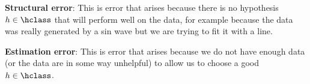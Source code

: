\documentclass[10pt,oneside]{book}
\begin{document}
\pagestyle{empty}
\thispagestyle{empty}

\begin{description}
\item{\bf Structural error}: This is error that arises because there
  is no hypothesis $h \in \hclass$ that will perform well on the data,
  for example because the data was really generated by a sin wave but
  we are trying to fit it with a line.
\item{\bf Estimation  error}:  This is error that arises because we
  do not have enough data (or the data are in some way unhelpful) to
  allow us to choose a good $h \in \hclass$.
\end{description}
\end{document}
